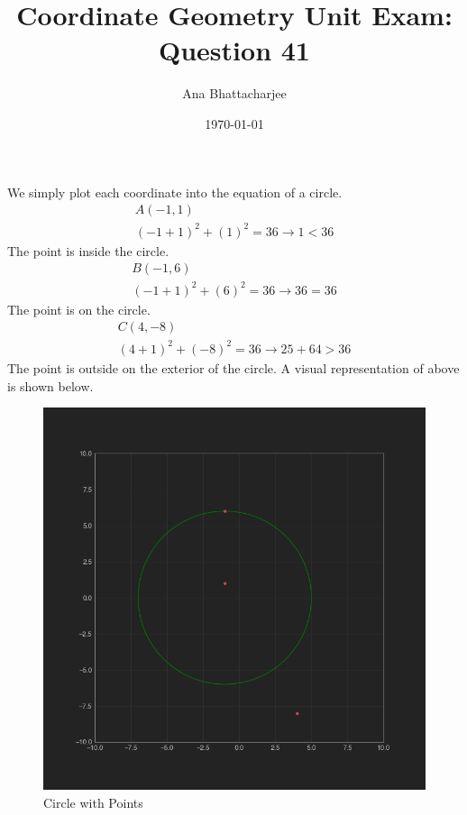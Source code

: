 \documentclass{article}
\begin{document}
\title{Coordinate Geometry Unit Exam: Question 41}
\author{Ana Bhattacharjee}
\date{\today}
\maketitle{}

\begin{center}
We simply plot each coordinate into the equation of a circle.
\begin{align}
  A (-1 , 1) \\
  (-1 + 1)^2 + (1)^2 = 36 \rightarrow 1 < 36
\end{align}
The point is inside the circle.
\begin{align}
  B (-1, 6) \\
  (-1 + 1)^2 + (6)^2 = 36 \rightarrow 36 = 36
\end{align}
The point is on the circle.
\begin{align}
  C (4, -8) \\
  (4 + 1)^2 + (-8)^2 = 36 \rightarrow 25 + 64 > 36
\end{align}
The point is outside on the exterior of the circle.
A visual representation of above is shown below.
\begin{figure}[!htbp]
  \includegraphics[width=1.0\columnwidth]{circle} 
  \caption{Circle with Points}
\end{figure}
\end{center}
\end{document}
